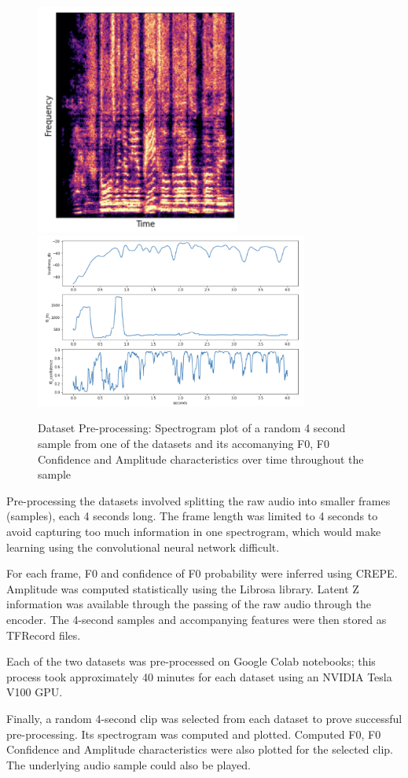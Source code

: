 \begin{figure}[H]
    \centering
    \includegraphics[width=0.6\textwidth]{research/dataset_preparation/PreprocessingSpecplot.png}
    \includegraphics[width=0.8\textwidth]{research/dataset_preparation/PreprocessingFeatures.png}
    \caption{Dataset Pre-processing: Spectrogram plot of a random 4 second sample from one of the datasets and its accomanying F0, F0 Confidence and Amplitude characteristics over time throughout the sample}
\end{figure}

Pre-processing the datasets involved splitting the raw audio into smaller frames (samples), each 4 seconds long. The frame length was limited to 4 seconds to avoid capturing too much information in one spectrogram, which would make learning using the convolutional neural network difficult.

For each frame, F0 and confidence of F0 probability were inferred using CREPE\cite{CREPE}. Amplitude was computed statistically using the Librosa library\cite{LibrosaPip}. Latent Z information was available through the passing of the raw audio through the encoder. The 4-second samples and accompanying features were then stored as TFRecord files.

Each of the two datasets was pre-processed on Google Colab notebooks; this process took approximately 40 minutes for each dataset using an NVIDIA Tesla V100 GPU.

Finally, a random 4-second clip was selected from each dataset to prove successful pre-processing. Its spectrogram was computed and plotted. Computed F0, F0 Confidence and Amplitude characteristics were also plotted for the selected clip. The underlying audio sample could also be played.